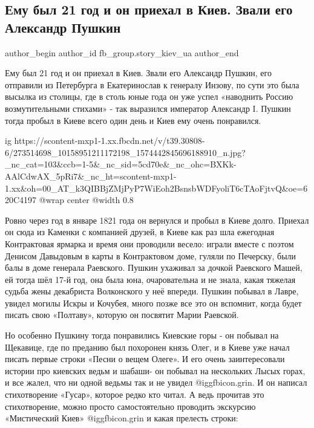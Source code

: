  
 
 
 
 
 
\subsection{Ему был 21 год и он приехал в Киев. Звали его Александр Пушкин}
\label{sec:10_02_2022.fb.fb_group.story_kiev_ua.2.pushkin}
 
\ifcmt
 author_begin
   author_id fb_group.story_kiev_ua
 author_end
\fi

Ему был 21 год и он приехал в Киев. Звали его Александр Пушкин, его отправили
из Петербурга в Екатеринослав к генералу Инзову, по сути это была высылка из
столицы, где в столь юные года он уже успел «наводнить Россию возмутительными
стихами» - так выразился император Александр I. Пушкин тогда пробыл в Киеве
всего один день и Киев ему очень понравился.

\ifcmt
  ig https://scontent-mxp1-1.xx.fbcdn.net/v/t39.30808-6/273514698_10158951211172198_1574442845696188910_n.jpg?_nc_cat=103&ccb=1-5&_nc_sid=5cd70e&_nc_ohc=BXKk-AAlCdwAX_5pRi7&_nc_ht=scontent-mxp1-1.xx&oh=00_AT_k3QIBBjZMjPyP7WiEoh2BsnsbWDFyoliT6cTAoFjtvQ&oe=620C4197
  @wrap center
  @width 0.8
\fi

Ровно через год в январе 1821 года он вернулся и пробыл в Киеве долго. Приехал
он сюда из Каменки с компанией друзей, в Киеве как раз шла ежегодная
Контрактовая ярмарка и время они проводили весело: играли вместе с поэтом
Денисом Давыдовым в карты в Контрактовом доме, гуляли по Печерску, были балы в
доме генерала Раевского. Пушкин ухаживал за дочкой Раевского Машей, ей тогда
шёл 17-й год, она была юна, очаровательна и не знала, какая тяжелая судьба жены
декабриста Волконского у неё впереди. Пушкин побывал в Лавре, увидел могилы
Искры и Кочубея, много позже все это он вспомнит, когда будет писать свою
«Полтаву», которую он посвятит Марии Раевской.

Но особенно Пушкину тогда понравились Киевские горы - он побывал на Щекавице,
где по преданию был похоронен князь Олег, и в Киеве уже начал писать первые
строки «Песни о вещем Олеге». И его очень заинтересовали истории про киевских
ведьм и шабаши- он побывал на нескольких Лысых горах, и все жалел, что ни одной
ведьмы так и не увидел @igg{fbicon.grin}. И он написал стихотворение «Гусар», которое редко кто
читал. А ведь прочитав это стихотворение, можно просто самостоятельно проводить
экскурсию «Мистический Киев» @igg{fbicon.grin}  и какая прелесть строки:

